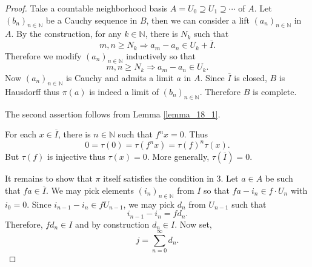 \documentclass[8pt]{article}
\numberwithin{equation}{section}
\newcommand{\N}[0]{\mathbb{N}}
\begin{document}
\begin{proof}
    Take a countable neighborhood basis $A=U_0\supseteq U_1\supseteq \cdots$ of $A$. Let $(b_n)_{n\in\N}$ be a Cauchy sequence in $B$, then we can consider a lift $(a_n)_{n\in \N}$ in $A$. By the construction, for any $k\in\N$, there is $N_k$ such that 
    \begin{equation*}
    m,n\geq N_k\Rightarrow a_m-a_n\in U_k + \overline{I}.
    \end{equation*}
    Therefore we modify $(a_n)_{n\in\N}$ inductively so that 
    \begin{equation*}
    m,n\geq N_k\Rightarrow a_m-a_n\in U_k.
    \end{equation*}
    Now $(a_n)_{n\in\N}$ is Cauchy and admits a limit $a$ in $A$. Since $\overline{I}$ is closed, $B$ is Hausdorff thus $\pi(a)$ is indeed a limit of $(b_n)_{n\in\N}$. Therefore $B$ is complete.
    \par The second assertion follows from Lemma \ref{lemma_18_1}. 
    \par For each $x\in\overline{I}$, there is $n\in\N$ such that $f^nx = 0$. Thus
    \begin{equation*}
    0 = \tau(0) = \tau(f^nx) = \tau(f)^n\tau(x).
    \end{equation*}
    But $\tau(f)$ is injective thus $\tau(x)=0$. More generally, $\tau(\overline{I})=0$. %
    \par It remains to show that $\pi$ itself satisfies the condition in 3. Let $a\in A$ be such that $fa\in \overline{I}$. We may pick elements $(i_n)_{n\in\N}$ from $I$ so that $fa-i_n\in f\cdot U_n$ with $i_0 = 0$. Since $i_{n-1}-i_n\in fU_{n-1}$, we may pick $d_n$ from $U_{n-1}$ such that 
    \begin{equation*}
    i_{n-1}-i_n = fd_n.
    \end{equation*}
    Therefore, $f d_n\in I$ and by construction $d_n\in I$. Now set,
    \begin{equation*}
    j = \sum_{n=0}^\infty d_n.
    \end{equation*}

\end{proof}
\end{document}

